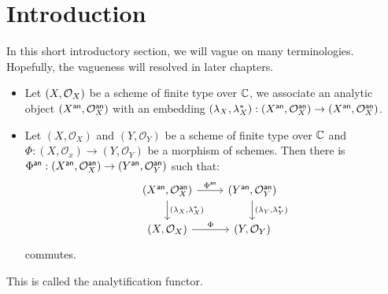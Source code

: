 \chapter{Introduction}

In this short introductory section, we will vague on many terminologies. Hopefully, the vagueness will resolved in later chapters.

\begin{itemize}
\item Let $(X, \mathcal{O}_{X})$ be a scheme of finite type over $\mathbb{C}$, we associate an analytic object $(X^{\mathsf{an}}, \mathcal{O}_{X}^{\mathsf{an}})$
with an embedding $(\lambda_{X}, \lambda^{*}_{X}) : (X^{\mathsf{an}}, \mathcal{O}_{X}^{\mathsf{an}}) \to (X^{\mathsf{an}}, \mathcal{O}_{X}^{\mathsf{an}})$.
\item Let $(X, \mathcal{O}_X)$ and $(Y, \mathcal{O}_Y)$ be a scheme of finite type over $\mathbb{C}$ and $\Phi : (X, \mathcal{O}_x) \to (Y, \mathcal{O}_Y)$ be a morphism of schemes. Then there is ${\Phi}^{\mathsf{an}} : (X^{\mathsf{an}}, \mathcal{O}_{X}^{\mathsf{an}}) \to (Y^{\mathsf{an}}, \mathcal{O}_{Y}^{\mathsf{an}})$ such that:
\[
\begin{tikzcd}
\anOfSchemeOf{X} \arrow[r, "{\an \Phi}"]\arrow[d, "{(\lambda_{X}, \lambda^{*}_{X})}"] & \anOfSchemeOf{Y} \ar[d, "{(\lambda_{Y}, \lambda^{*}_{Y})}"]\\
\schemeOf{X} \ar[r, "\Phi"] & \schemeOf{Y}
\end{tikzcd}
\]
commutes.
\end{itemize}

This is called the analytification functor.





